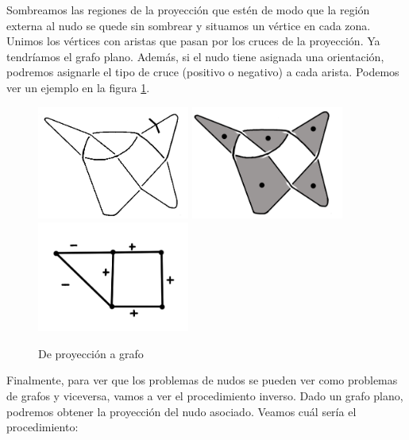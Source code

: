 Sombreamos las regiones de la proyección que estén de modo que la región externa al nudo se quede sin sombrear y situamos un vértice en cada zona. Unimos los vértices con aristas que pasan por los cruces de la proyección. Ya tendríamos el grafo plano. Además, si el nudo tiene asignada una orientación, podremos asignarle el tipo de cruce (positivo o negativo) a cada arista. Podemos ver un ejemplo en la figura \ref{graf2}.\\
\begin{figure}[h!]
	\centering
	\includegraphics[width=5cm]{inudos/pgrafo3.png}
	\includegraphics[width=5cm]{inudos/pgrafo2.png}
	\includegraphics[width=5cm]{inudos/pgrafo1.png}
	\caption{De proyección a grafo}
	\label{graf2} 
\end{figure}

Finalmente, para ver que los problemas de nudos se pueden ver como problemas de grafos y viceversa, vamos a ver el procedimiento inverso. Dado un grafo plano, podremos obtener la proyección del nudo asociado. Veamos cuál sería el procedimiento:\\

